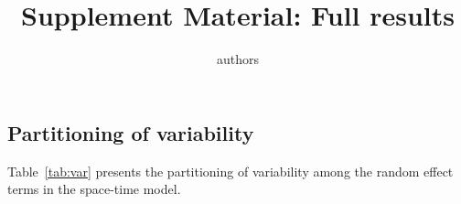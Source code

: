 \documentclass[12pt]{article}\usepackage[]{graphicx}\usepackage[]{color}
\begin{document}


% 
% 

\title{Supplement Material: Full results}
\author{authors}

\sloppy
\maketitle
\tableofcontents
{}
\subsection{Partitioning of variability}
Table~\ref{tab:var} presents the partitioning of variability among the random effect terms in the space-time model.
\end{document}
